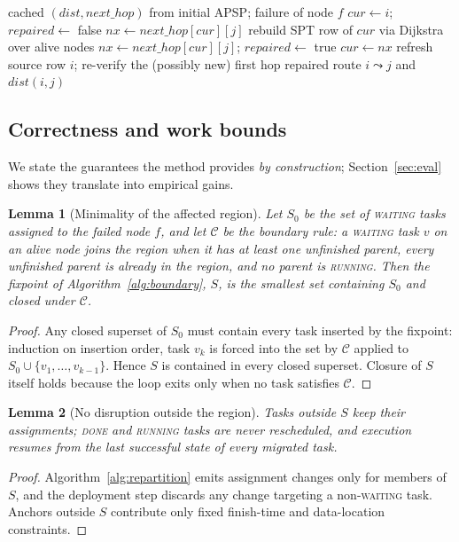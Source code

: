 \documentclass[conference]{IEEEtran}
\newtheorem{lemma}{Lemma}
\theoremstyle{remark}
\begin{document}
\begin{algorithm}
\caption{Lazy route repair for query $(i,j)$}
\label{alg:paths}
\begin{algorithmic}[1]
\REQUIRE cached $(\mathit{dist}, \mathit{next\_hop})$ from initial APSP;
         failure of node $f$
\STATE $\mathit{cur} \gets i$;\quad $\mathit{repaired} \gets$ false
  \STATE $\mathit{nx} \gets \mathit{next\_hop}[\mathit{cur}][j]$
    \STATE rebuild SPT row of $\mathit{cur}$ via Dijkstra over alive nodes
    \STATE $\mathit{nx} \gets \mathit{next\_hop}[\mathit{cur}][j]$;\quad
           $\mathit{repaired} \gets$ true
  \ENDIF
  \STATE $\mathit{cur} \gets \mathit{nx}$
\ENDWHILE
{}
  \STATE refresh source row $i$; re-verify the (possibly new) first hop
\ENDIF
\RETURN repaired route $i \leadsto j$ and $\mathit{dist}(i,j)$
\end{algorithmic}
\end{algorithm}

\subsection{Correctness and work bounds}
\label{sec:analysis}

We state the guarantees the method provides \emph{by construction};
Section~\ref{sec:eval} shows they translate into empirical gains.

\begin{lemma}[Minimality of the affected region]
Let $S_0$ be the set of \textsc{waiting} tasks assigned to the failed node
$f$, and let $\mathcal{C}$ be the boundary rule: a \textsc{waiting} task $v$
on an alive node joins the region when it has at least one unfinished
parent, every unfinished parent is already in the region, and no parent is
\textsc{running}. Then the fixpoint of Algorithm~\ref{alg:boundary},
$S$, is the \emph{smallest} set containing $S_0$ and closed under
$\mathcal{C}$.
\end{lemma}
\begin{proof}
Any closed superset of $S_0$ must contain every task inserted by the
fixpoint: induction on insertion order, task $v_k$ is forced into the set by
$\mathcal{C}$ applied to $S_0 \cup \{v_1,\dots,v_{k-1}\}$. Hence $S$ is
contained in every closed superset. Closure of $S$ itself holds because the
loop exits only when no task satisfies $\mathcal{C}$.
\end{proof}

\begin{lemma}[No disruption outside the region]
\label{lem:nodisrupt}
Tasks outside $S$ keep their assignments; \textsc{done} and
\textsc{running} tasks are never rescheduled, and execution resumes from
the last successful state of every migrated task.
\end{lemma}
\begin{proof}
Algorithm~\ref{alg:repartition} emits assignment changes only for members of
$S$, and the deployment step discards any change targeting a
non-\textsc{waiting} task. Anchors outside $S$ contribute only
fixed finish-time and data-location constraints.
\end{proof}
\end{document}
